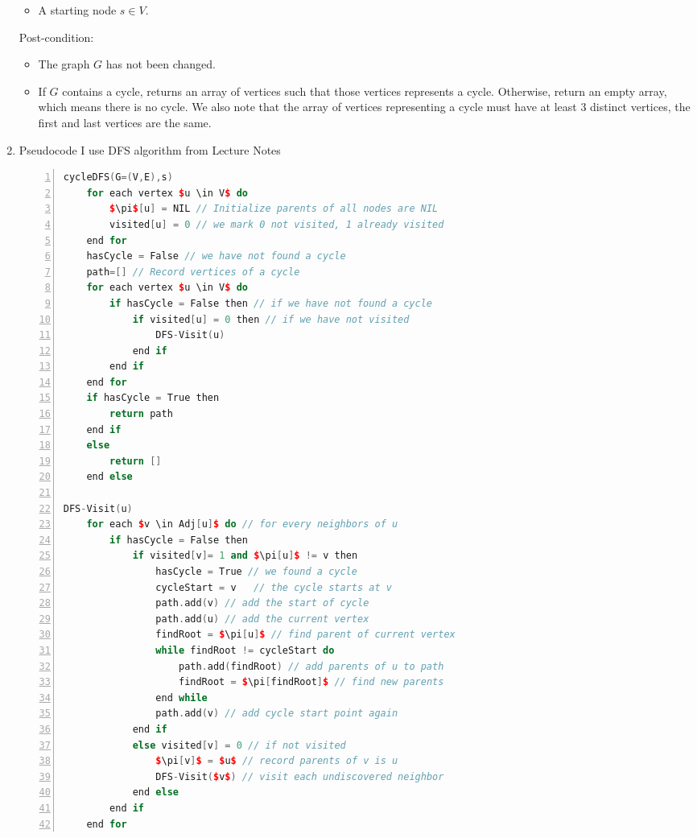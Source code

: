 \documentclass{cpsc413Solutions}
\begin{document}
\begin{problemlist}
\begin{problem}
\begin{answer}
\begin{enumerate}
\begin{itemize}
        \item A starting node $s\in V$. 
    \end{itemize}
    
    Post-condition:
    \begin{itemize}
        \item The graph $G$ has not been changed.
        \item If $G$ contains a cycle, returns an array of vertices such that those vertices represents a cycle. Otherwise, return an empty array, which means there is no cycle. We also note that the array of vertices representing a cycle must have at least 3 distinct vertices, the first and last vertices are the same.
        
    \end{itemize}
    
    \item Pseudocode
    I use DFS algorithm from Lecture Notes
    
  \begin{lstlisting}[numbers=left, language=C++, mathescape=true]
cycleDFS(G=(V,E),s)
    for each vertex $u \in V$ do 
        $\pi$[u] = NIL // Initialize parents of all nodes are NIL
        visited[u] = 0 // we mark 0 not visited, 1 already visited
    end for
    hasCycle = False // we have not found a cycle
    path=[] // Record vertices of a cycle
    for each vertex $u \in V$ do
        if hasCycle = False then // if we have not found a cycle
            if visited[u] = 0 then // if we have not visited
                DFS-Visit(u)
            end if
        end if
    end for
    if hasCycle = True then
        return path
    end if
    else
        return []
    end else
    
DFS-Visit(u)
    for each $v \in Adj[u]$ do // for every neighbors of u
        if hasCycle = False then 
            if visited[v]= 1 and $\pi[u]$ != v then
                hasCycle = True // we found a cycle
                cycleStart = v   // the cycle starts at v
                path.add(v) // add the start of cycle
                path.add(u) // add the current vertex
                findRoot = $\pi[u]$ // find parent of current vertex
                while findRoot != cycleStart do
                    path.add(findRoot) // add parents of u to path
                    findRoot = $\pi[findRoot]$ // find new parents
                end while
                path.add(v) // add cycle start point again
            end if
            else visited[v] = 0 // if not visited
                $\pi[v]$ = $u$ // record parents of v is u
                DFS-Visit($v$) // visit each undiscovered neighbor 
            end else
        end if
    end for
\end{lstlisting}


\end{enumerate}
\end{answer}
\end{problem}
\end{problemlist}
\end{document}
